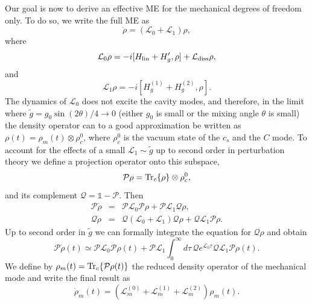 Our goal is now to derive an effective ME for the mechanical degrees of freedom
only. To do so, we write the full ME as
\begin{equation}
\dot \rho = \left(\mathcal{L}_0 + \mathcal{L}_1\right)\rho,
\end{equation}
where 
\begin{equation}
\mathcal{L}_0\rho = -i[H_{\rm lin}+ H_g^\prime,\rho] + \mathcal{L}_{\rm diss}
\rho,
\end{equation}
and
\begin{equation}
\mathcal{L}_1\rho = -i[H_{g}^{(1)}+ H_g^{(2)},\rho].
\end{equation}
The dynamics of $\mathcal{L}_0$ does not excite the cavity modes, and therefore,
in the limit where $\tilde g=g_0\sin(2\theta)/4\rightarrow 0$ (either $g_0$ is
small or the mixing angle $\theta$ is small) the density operator can to a good
approximation be written as $\rho(t)=\rho_m(t) \otimes \rho_c^0$, where
$\rho_c^0$ is the vacuum state of the $c_s$ and the $C$ mode. To account for the
effects of a small $\mathcal{L}_1\sim\tilde g$ up to second order in
perturbation theory we define a projection operator onto this subspace,
\begin{equation}
\mathcal{P}\rho = {\rm Tr}_c\{ \rho \}\otimes \rho_c^0,
\end{equation}
and its complement $\mathcal{Q}=\mathds{1}-\mathcal{P}$. Then
\begin{eqnarray}
\mathcal{P}\dot \rho&=& \mathcal{P}\mathcal{L}_0\mathcal{P} \rho + \mathcal{P}
\mathcal{L}_{1}\mathcal{Q}\rho,\\
\mathcal{Q}\dot \rho&=& \mathcal{Q}(\mathcal{L}_0+\mathcal{L}_{1})\mathcal{Q}
\rho +  \mathcal{Q}\mathcal{L}_{1}\mathcal{P}\rho.
\end{eqnarray}
 Up to second order in $\tilde g$ we can formally integrate the equation for
 $\mathcal{Q}\rho$ and obtain
\begin{equation}
\mathcal{P}\dot{\rho}(t)\simeq\mathcal{P}\mathcal{L}_{0}\mathcal{P}\rho(t)+\mathcal{P}\mathcal{L}_{1}\int_{0}^{\infty}
 d\tau\, \mathcal{Q}
e^{\mathcal{L}_{0}\tau}\mathcal{Q}\mathcal{L}_{1}\mathcal{P}\rho(t).
\end{equation}
We define by $\rho_m(t)={\rm Tr}_c\{\mathcal{P} \rho(t)\}$ the reduced density
operator of the mechanical mode and write the final result as
\begin{equation}\label{eq:SM_Lm}
\dot\rho_m(t)=\left( \mathcal{L}^{(0)}_m+  \mathcal{L}^{(1)}_m   + 
\mathcal{L}^{(2)}_m\right) \rho_m(t).
\end{equation}
